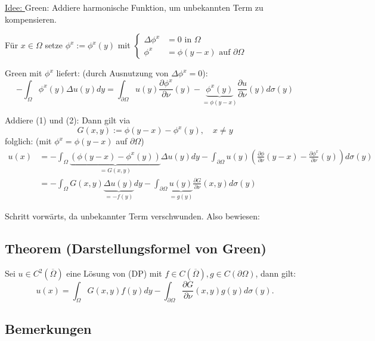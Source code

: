 \underline{Idee: } Green: Addiere harmonische Funktion, um unbekannten Term zu kompensieren.

Für $x \in \Omega$ setze $\phi^x := \phi^x(y)$ mit $\begin{cases} \Delta \phi^x &= 0 \text{ in } \Omega \\ \phi^x &= \phi(y - x) \text{ auf } \partial \Omega \end{cases}$

Green mit $\phi^x$ liefert: (durch Ausnutzung von $\Delta \phi^x = 0$):
\begin{displaymath}
  - \int_\Omega \phi^x(y) \Delta u(y) dy = \int_{\partial \Omega} u(y) \frac{\partial \phi^x}{\partial \nu}(y) - \underbrace{\phi^x(y)}_{= \phi(y - x)} \frac{\partial u}{\partial \nu}(y) d\sigma(y) \tag{2}
\end{displaymath}

Addiere (1) und (2): Dann gilt via
$$
G(x,y) := \phi(y - x) - \phi^x(y), \quad x \neq y
$$
folglich: (mit $\phi^x = \phi(y - x)$ auf $\partial\Omega$)
\begin{align*}
	u(x) &= -\int_{\Omega} \underbrace{(\phi(y - x) - \phi^x(y))}_{= G(x,y)} \Delta u(y) dy - \int_{\partial \Omega} u(y) ( \frac{\partial \phi}{\partial \nu}(y - x) - \frac{\partial \phi^x}{\partial \nu}(y)) d\sigma(y) \\
	&= -\int_\Omega G(x,y) \underbrace{\Delta u(y)}_{= -f(y)} dy - \int_{\partial \Omega} \underbrace{u(y)}_{= g(y)} \frac{\partial G}{\partial \nu}(x,y) d\sigma(y)
\end{align*}

Schritt vorwärts, da unbekannter Term verschwunden. Also bewiesen:

\subsection{Theorem (Darstellungsformel von Green)}

Sei $u \in C^2(\overline\Omega)$ eine Lösung von (DP) mit $f \in C(\overline\Omega), g \in C(\partial \Omega)$, dann gilt:
$$
u(x) = \int_\Omega G(x,y) f(y) dy - \int_{\partial \Omega}  \frac{\partial G}{\partial \nu}(x,y) g(y) d\sigma(y).
$$

\subsection{Bemerkungen}

